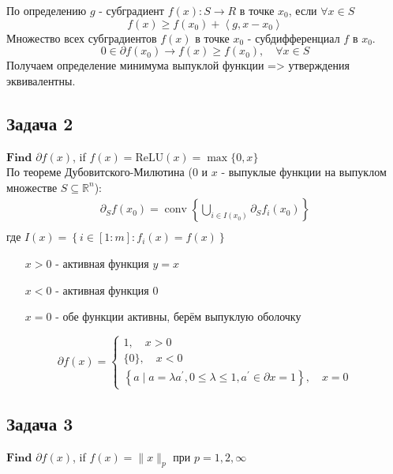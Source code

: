 \documentclass[12pt,letterpaper]{article}
\begin{document}
По определению $ g $ - субградиент $ f(x) : S\rightarrow R $ в точке $ x_0 $, если $ \forall x \in S $
$$
f(x) \geq f\left(x_{0}\right)+\left\langle g, x-x_{0}\right\rangle
$$
Множество всех субградиентов $ f(x) $ в точке $ x_0 $ - субдифференциал $ f $ в $ x_0 $. 
$$ 0 \in \partial f(x_0) \longrightarrow f(x) \geq f\left(x_{0}\right), \quad \forall x \in S $$
Получаем определение минимума выпуклой функции => утверждения эквивалентны.

\subsection*{Задача 2}
$\textbf{Find}$ $\partial f(x)$, if $f(x) = \text{ReLU}(x) = \max \{0, x\}$\\

По теореме Дубовитского-Милютина ($ 0 $ и $ x $ - выпуклые функции на выпуклом множестве $S \subseteq \mathbb{R}^{n} $): 
$$
\begin{array}{r}
\partial_{S} f\left(x_{0}\right)=\operatorname{conv}\left\{\bigcup\limits_{i \in I\left(x_{0}\right)} \partial_{S} f_{i}\left(x_{0}\right)\right\} \\
\end{array}
$$
где $I(x)=\left\{i \in[1: m]: f_{i}(x)=f(x)\right\}$
\begin{itemize}
	\item[$ x > 0 $ ] - активная функция $ y = x $
	\item[$ x < 0 $] - активная функция $ 0 $
	\item[$ x = 0 $] - обе функции активны, берём выпуклую оболочку
\end{itemize}

$$
\partial f(x)=\left\{\begin{array}{l}
1, \quad x>0 \\
\{0\}, \quad x<0 \\
\left\{a \mid a=\lambda a^{\prime}, 0 \leq \lambda \leq 1, a^{\prime} \in \partial x = 1 \right\}, \quad x=0
\end{array}\right.
$$

\subsection*{Задача 3}
$\textbf{Find}$ $\partial f(x)$, if $f(x) = \|x\|_p$ $\textbf{при}$ $p = 1,2, \infty$\\
\end{document}
